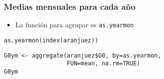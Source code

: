 \documentclass{beamer}
\begin{document}
\begin{frame}[fragile]
\frametitle{Medias mensuales para cada año}
\label{sec-4-3}

\begin{itemize}
\item La función para agrupar es \texttt{as.yearmon}
\end{itemize}

\lstset{language=R}
\begin{lstlisting}
as.yearmon(index(aranjuez))
\end{lstlisting}


\lstset{language=R}
\begin{lstlisting}
G0ym <- aggregate(aranjuez$G0, by=as.yearmon,
                  FUN=mean, na.rm=TRUE)
G0ym
\end{lstlisting}
\end{frame}
\end{document}
